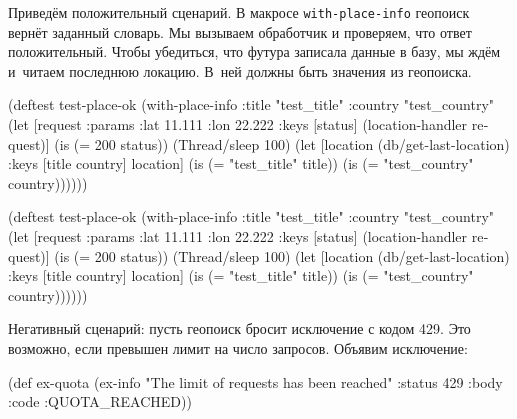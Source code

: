 Приведём положительный сценарий. В макросе \verb|with-place-info| геопоиск
вернёт заданный словарь. Мы вызываем обработчик и проверяем, что ответ
положительный. Чтобы убедиться, что футура записала данные в базу, мы ждём
и~читаем последнюю локацию. В~ней должны быть значения из геопоиска.

\ifx\DEVICETYPE\MOBILE

\begin{english}
  \begin{clojure}
(deftest test-place-ok
  (with-place-info
    {:title "test_title"
     :country "test_country"}
    (let [request {:params
                   {:lat 11.111
                    :lon 22.222}}
          {:keys [status]}
          (location-handler request)]
      (is (= 200 status))
      (Thread/sleep 100)
      (let [location
            (db/get-last-location)
            {:keys [title country]}
            location]
        (is (= "test_title" title))
        (is (= "test_country"
               country))))))
  \end{clojure}
\end{english}

\else

\begin{english}
  \begin{clojure}
(deftest test-place-ok
  (with-place-info
    {:title "test_title"
     :country "test_country"}
    (let [request {:params {:lat 11.111 :lon 22.222}}
          {:keys [status]} (location-handler request)]
      (is (= 200 status))
      (Thread/sleep 100)
      (let [location (db/get-last-location)
            {:keys [title country]} location]
        (is (= "test_title" title))
        (is (= "test_country" country))))))
  \end{clojure}
\end{english}

\fi


Негативный сценарий: пусть геопоиск бросит исключение с кодом 429. Это
возможно, если превышен лимит на число запросов. Объявим исключение:

\ifx\DEVICETYPE\MOBILE

\begin{english}
  \begin{clojure}
(def ex-quota
  (ex-info
    "The limit of requests
               has been reached"
    {:status 429
     :body {:code :QUOTA_REACHED}}))
  \end{clojure}
\end{english}

